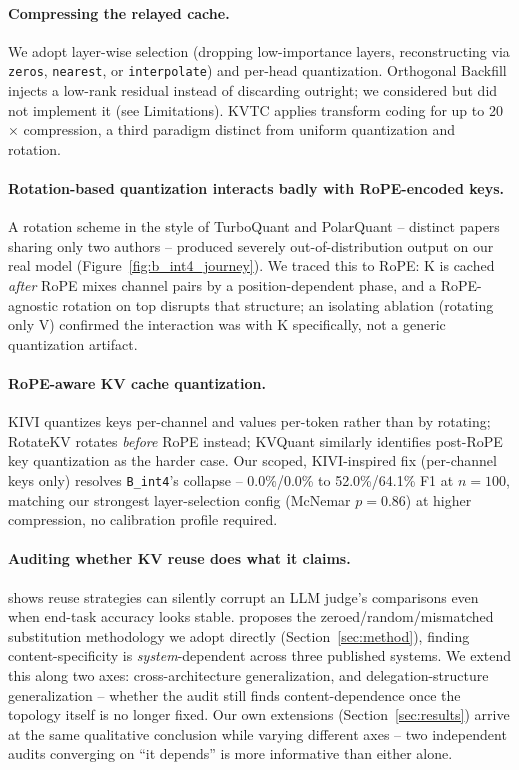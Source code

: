 \documentclass[11pt]{article}
\begin{document}
\paragraph{Compressing the relayed cache.} We adopt layer-wise selection
(dropping low-importance layers, reconstructing via \texttt{zeros},
\texttt{nearest}, or \texttt{interpolate}) and per-head quantization.
Orthogonal Backfill \citep{orthobackfill2026} injects a low-rank residual
instead of discarding outright; we considered but did not implement it
(see Limitations). KVTC \citep{kvtc2026} applies transform coding for up
to 20$\times$ compression, a third paradigm distinct from uniform
quantization and rotation.

\paragraph{Rotation-based quantization interacts badly with RoPE-encoded
keys.} A rotation scheme in the style of TurboQuant \citep{turboquant2026}
and PolarQuant \citep{polarquant2026} -- distinct papers sharing only two
authors -- produced severely out-of-distribution output on our real model
(Figure~\ref{fig:b_int4_journey}). We traced this to RoPE: K is cached
\emph{after} RoPE mixes channel pairs by a position-dependent phase, and a
RoPE-agnostic rotation on top disrupts that structure; an isolating
ablation (rotating only V) confirmed the interaction was with K
specifically, not a generic quantization artifact.

\paragraph{RoPE-aware KV cache quantization.} KIVI \citep{kivi2024}
quantizes keys per-channel and values per-token rather than by rotating;
RotateKV \citep{rotatekv2025} rotates \emph{before} RoPE instead; KVQuant
\citep{kvquant2024} similarly identifies post-RoPE key quantization as
the harder case. Our scoped, KIVI-inspired fix (per-channel keys only)
resolves \texttt{B\_int4}'s collapse -- 0.0\%/0.0\% to 52.0\%/64.1\% F1 at
$n=100$, matching our strongest layer-selection config (McNemar
$p=0.86$) at higher compression, no calibration profile required.

\paragraph{Auditing whether KV reuse does what it claims.}
\citet{kvreusefails2026} shows reuse strategies can silently corrupt an
LLM judge's comparisons even when end-task accuracy looks stable.
\citet{latentcommpay2026} proposes the zeroed/random/mismatched
substitution methodology we adopt directly (Section~\ref{sec:method}),
finding content-specificity is \emph{system}-dependent across three
published systems. We extend this along two axes: cross-architecture
generalization, and delegation-structure generalization -- whether the
audit still finds content-dependence once the topology itself is no
longer fixed. Our own extensions (Section~\ref{sec:results}) arrive at
the same qualitative conclusion while varying different axes -- two
independent audits converging on ``it depends'' is more informative than
either alone.
\end{document}

